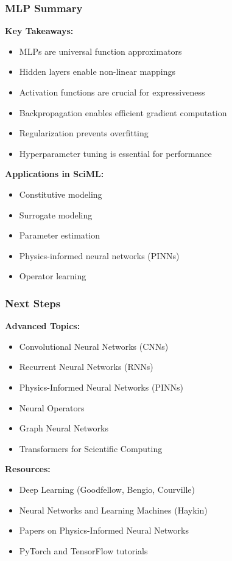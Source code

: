 \documentclass{beamer}
\begin{document}
\begin{frame}
\frametitle{MLP Summary}
\textbf{Key Takeaways:}
\begin{itemize}
    \item MLPs are universal function approximators
    \item Hidden layers enable non-linear mappings
    \item Activation functions are crucial for expressiveness
    \item Backpropagation enables efficient gradient computation
    \item Regularization prevents overfitting
    \item Hyperparameter tuning is essential for performance
\end{itemize}

\vspace{1em}

\textbf{Applications in SciML:}
\begin{itemize}
    \item Constitutive modeling
    \item Surrogate modeling
    \item Parameter estimation
    \item Physics-informed neural networks (PINNs)
    \item Operator learning
\end{itemize}
\end{frame}

\begin{frame}
\frametitle{Next Steps}
\textbf{Advanced Topics:}
\begin{itemize}
    \item Convolutional Neural Networks (CNNs)
    \item Recurrent Neural Networks (RNNs)
    \item Physics-Informed Neural Networks (PINNs)
    \item Neural Operators
    \item Graph Neural Networks
    \item Transformers for Scientific Computing
\end{itemize}

\vspace{1em}

\textbf{Resources:}
\begin{itemize}
    \item Deep Learning (Goodfellow, Bengio, Courville)
    \item Neural Networks and Learning Machines (Haykin)
    \item Papers on Physics-Informed Neural Networks
    \item PyTorch and TensorFlow tutorials
\end{itemize}
\end{frame}
\end{document}
